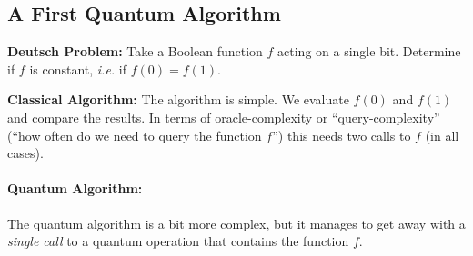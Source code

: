 \subsection{A First Quantum Algorithm}

\begin{def*}
\noindent\textbf{Deutsch Problem:} Take a Boolean function $f$ acting on a single bit. Determine if $f$ is constant, \textit{i.e.} if $f(0)=f(1)$.
\end{def*}

\begin{algo*}
\noindent\textbf{Classical Algorithm:} The algorithm is simple. We evaluate $f(0)$ and $f(1)$ and compare the results. In terms of oracle-complexity or ``query-complexity'' (``how often do we need to query the function $f$'') this needs two calls to $f$ (in all cases).
\end{algo*}

\paragraph{Quantum Algorithm:} 
The quantum algorithm is a bit more complex, but it manages to get away with a \textit{single call} to a quantum operation that contains the function $f$.

